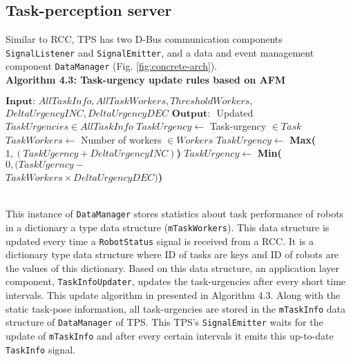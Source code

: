 \subsection{Task-perception server}
Similar to RCC,  TPS has two D-Bus communication components\\ \texttt{SignalListener} and \texttt{SignalEmitter}, and a data and event management component \texttt{DataManager} (Fig. \ref{fig:concrete-arch}).\\ 
\textbf{Algorithm 4.3: Task-urgency update rules  based on AFM}
\vspace{-3mm}
\newline
\HRule
\begin{algorithmic}[1]
\begin{small}
\label{alg:tps}
\State $\textbf{Input: } AllTaskInfo, AllTaskWorkers, ThresholdWorkers,$\\ \hspace*{1cm}$DeltaUrgencyINC, DeltaUrgencyDEC$
\State $\textbf{Output: }$ Updated $TaskUrgencies \in AllTaskInfo$
\State $ TaskUrgency \gets  $ Task-urgency $\in Task$
\State $ TaskWorkers \gets  $   Number of workers $ \in Workers$
\State $ TaskUrgency \gets $ \textbf{Max(}$1, (TaskUgerncy + DeltaUrgencyINC)$\textbf{)}
\Else
\State $ TaskUrgency \gets $ \textbf{Min(}$0, (TaskUgerncy - $\\ \hspace*{5.3cm}$ TaskWorkers  \times DeltaUrgencyDEC)$\textbf{)}
\EndIf
\EndFor
\end{small}
\end{algorithmic}
\vspace{-3mm} 
\HRule\\
This instance of \texttt{DataManager} stores statistics about task performance of robots in a dictionary a type data structure (\texttt{mTaskWorkers}). This data structure is\\ updated every time a \texttt{RobotStatus} signal is received from a RCC. It is a dictionary type data structure where ID of tasks are keys and ID of robots are the values of this dictionary. Based on this data structure, an application layer component, \texttt{TaskInfoUpdater}, updates the task-urgencies after every short time intervals. This update algorithm in presented in Algorithm 4.3.  Along with the static task-pose information, all task-urgencies are stored in the \texttt{mTaskInfo} data structure of  \texttt{DataManager} of TPS. This TPS's \texttt{SignalEmitter} waits for the update of \texttt{mTaskInfo} and after every certain intervals it emits this up-to-date \texttt{TaskInfo} signal.


